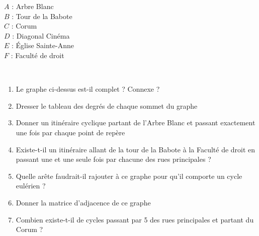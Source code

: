 \documentclass[oneside,12pt]{book}          %
\begin{document}
\hspace{3cm}
\begin{minipage}[c]{0.3\linewidth}
$A$ : Arbre Blanc \\
$B$ : Tour de la Babote \\
$C$ : Corum \\
$D$ : Diagonal Cinéma \\
$E$ : Église Sainte-Anne \\
$F$ : Faculté de droit
\end{minipage}
\begin{minipage}[c]{0.3\linewidth}
\end{minipage}\\[10pt]

\begin{enumerate}
    \item Le graphe ci-dessus est-il complet ? Connexe ?
    \item Dresser le tableau des degrés de chaque sommet du graphe
    \item Donner un itinéraire cyclique partant de l'Arbre Blanc et passant exactement une fois par chaque point de repère
    \item Existe-t-il un itinéraire allant de la tour de la Babote à la Faculté de droit en passant une et une seule fois par chacune des rues principales ?
    \item Quelle arête faudrait-il rajouter à ce graphe pour qu'il comporte un cycle eulérien ?
    \item Donner la matrice d'adjacence de ce graphe
    \item Combien existe-t-il de cycles passant par 5 des rues principales et partant du Corum ?
\end{enumerate}
\end{document}
